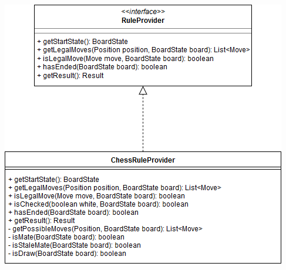 \documentclass[parskip=full]{scrartcl}
\begin{document}
		\begin{minipage}{\linewidth}
			\centering
			\includegraphics[width=1\linewidth]{Diagramme/RuleProvider}
			\label{fig:ruleProvider}
		\end{minipage}
\end{document}
